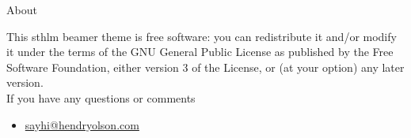 \documentclass[compress]{beamer}
\begin{document}
%
%

\begin{frame}{About}
	
	This sthlm beamer theme is free software: you can redistribute it and/or modify
	it under the terms of the GNU General Public License as published by
	the Free Software Foundation, either version 3 of the License, or
	(at your option) any later version.\\

	If you have any questions or comments
	\begin{itemize}
		\item \url{sayhi@hendryolson.com}
	\end{itemize}
\end{frame}
\end{document}
